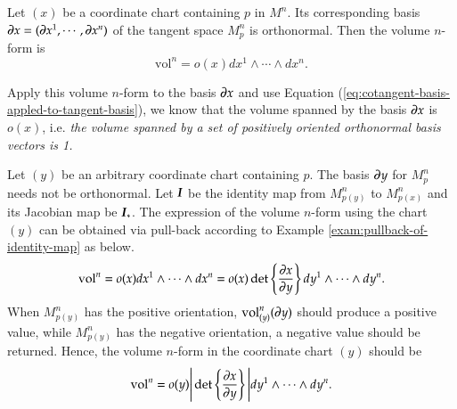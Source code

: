 \documentclass[11pt, a4paper]{book}
\begin{document}
\begin{Definition}
  \label{def:volume-form}
  Let $(x)$ be a coordinate chart containing $p$ in $M^n$. Its corresponding basis
  $\boldsymbol{\partial}x = (\boldsymbol{\partial}x^1,\cdots,\boldsymbol{\partial}x^n)$ of the tangent space
  $M_p^n$ is orthonormal. Then the volume $n$-form is
  \begin{equation}
    \label{eq:volume-form}
    \mathrm{vol}^n = o(x) dx^1 \wedge \cdots \wedge dx^n.
  \end{equation}
\end{Definition} 
Apply this volume $n$-form to the basis $\boldsymbol{\partial}x$ and use Equation
(\ref{eq:cotangent-basis-appled-to-tangent-basis}), we know that the volume spanned by the
basis $\boldsymbol{\partial}x$ is $o(x)$, i.e. \emph{the volume spanned by a set of positively
  oriented orthonormal basis vectors is 1.}

Let $(y)$ be an arbitrary coordinate chart containing $p$. The basis $\boldsymbol{\partial}y$ for
$M_{p}^n$ needs not be orthonormal. Let $\boldsymbol{I}$ be the identity map from $M_{p(y)}^n$
to $M_{p(x)}^n$ and its Jacobian map be $\boldsymbol{I}_{*}$. The expression of the volume
$n$-form using the chart $(y)$ can be obtained via pull-back according to Example
\ref{exam:pullback-of-identity-map} as below.
\begin{equation*}
  \mathrm{vol}^n = o(x) dx^1 \wedge \cdots \wedge dx^n = o(x) \det \left\{  \frac{\partial x}{\partial
      y} \right\} dy^1 \wedge \cdots \wedge dy^n.
\end{equation*}
When $M_{p(y)}^n$ has the positive orientation, $\mathrm{vol}_{(y)}^n(\boldsymbol{\partial}y)$
should produce a positive value, while $M_{p(y)}^n$ has the negative orientation, a
negative value should be returned. Hence, the volume $n$-form in the coordinate chart
$(y)$ should be
\begin{equation}
  \label{eq:volume-form-in-y}
  \mathrm{vol}^n = o(y) \Bigg\vert\det \left\{ \frac{\partial x}{\partial y}
  \right\}\Bigg\vert dy^1 \wedge\cdots\wedge dy^n.
\end{equation}
\end{document}
